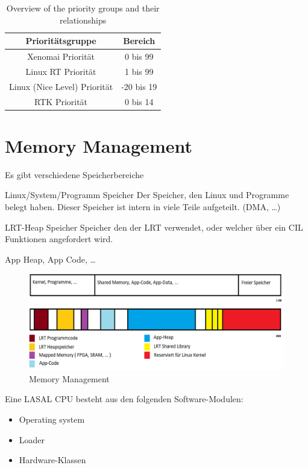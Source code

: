 \documentclass[MMR,Master,english]{twbook}
\begin{document}
\begin{table}[ht]
    \centering
    \caption{Overview of the priority groups and their relationships}
    \label{tab:priorities}
    \begin{tabular}{|c|c|}
        \hline
        \textbf{Prioritätsgruppe} & \textbf{Bereich}  \\ \hline
        Xenomai Priorität & 0 bis 99  \\ \hline
        Linux RT Priorität & 1 bis 99 \\ \hline
        Linux (Nice Level) Priorität & -20 bis 19  \\ \hline
        RTK Priorität & 0 bis 14 \\ \hline
    \end{tabular}

\end{table}
 



\section{Memory Management}
Es gibt verschiedene Speicherbereiche

Linux/System/Programm Speicher
	Der Speicher, den Linux und Programme belegt haben.
	Dieser Speicher ist intern in viele Teile aufgeteilt. (DMA, …)

LRT-Heap Speicher
	Speicher den der LRT verwendet, oder welcher über ein CIL Funktionen
	angefordert wird.

App Heap, App Code, …


\begin{figure}[H]
    \centering
    \includegraphics[width=0.8\columnwidth]{img/RAM_Memory_management.png}
    \caption[Memory Management]{Memory Management}
    \label{fig:memory_management}
  \end{figure}


  Eine LASAL CPU besteht aus den folgenden Software-Modulen:
  \begin{itemize}
    \item Operating system
    \item Loader
    \item Hardware-Klassen
  \end{itemize}
  
\end{document}
